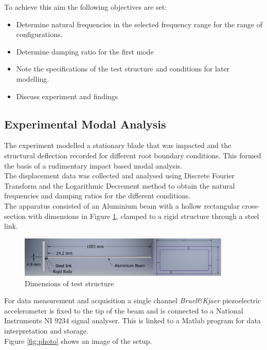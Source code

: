 \documentclass[11pt]{article}
\begin{document}
To achieve this aim the following objectives are set:
\begin{itemize}
    \item Determine natural frequencies in the selected frequency range for the range of configurations.
    \item Determine damping ratio for the first mode 
    \item Note the specifications of the test structure and conditions for later modelling.
    \item Discuss experiment and findings
\end{itemize}{}




\subsection{Experimental Modal Analysis}
The experiment modelled a stationary blade that was impacted and the structural deflection recorded for different root boundary conditions. This formed the basis of a rudimentary impact based modal analysis. \\
The displacement data was collected and analysed using Discrete Fourier Transform and the Logarithmic Decrement method to obtain the natural frequencies and damping ratios for the different conditions.\\
The apparatus consisted of an Aluminium beam with a hollow rectangular cross-section with dimensions in Figure \ref{fig:dim}, clamped to a rigid structure through a steel link.\\

\begin{figure}[H]
    \centering
    \includegraphics[width=0.9\textwidth]{dimensions.PNG}
    \caption{Dimensions of test structure}
    \label{fig:dim}
\end{figure}{}
For data measurement and acquisition a single channel \textit{Bruel\&Kjaer} piezoelectric accelerometer is fixed to the tip of the beam and is connected to a National Instruments NI 9234 signal analyser. This is linked to a Matlab program for data interpretation and storage. \\
Figure \ref{fig:photo} shows an image of the setup.
\end{document}
